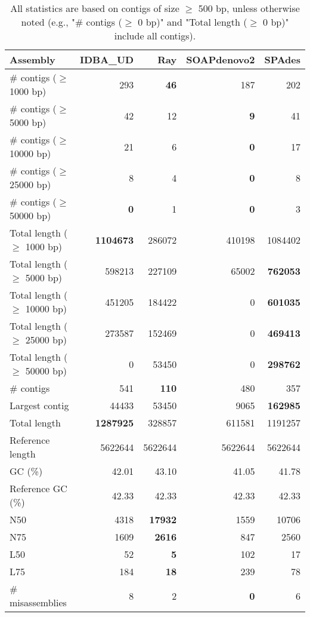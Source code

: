 \documentclass[12pt,a4paper]{article}
\begin{document}
\begin{table}[ht]
\begin{center}
\caption{All statistics are based on contigs of size $\geq$ 500 bp, unless otherwise noted (e.g., "\# contigs ($\geq$ 0 bp)" and "Total length ($\geq$ 0 bp)" include all contigs).}
\begin{tabular}{|l*{4}{|r}|}
\hline
Assembly & IDBA\_UD & Ray & SOAPdenovo2 & SPAdes \\ \hline
\# contigs ($\geq$ 1000 bp) & 293 & {\bf 46} & 187 & 202 \\ \hline
\# contigs ($\geq$ 5000 bp) & 42 & 12 & {\bf 9} & 41 \\ \hline
\# contigs ($\geq$ 10000 bp) & 21 & 6 & {\bf 0} & 17 \\ \hline
\# contigs ($\geq$ 25000 bp) & 8 & 4 & {\bf 0} & 8 \\ \hline
\# contigs ($\geq$ 50000 bp) & {\bf 0} & 1 & {\bf 0} & 3 \\ \hline
Total length ($\geq$ 1000 bp) & {\bf 1104673} & 286072 & 410198 & 1084402 \\ \hline
Total length ($\geq$ 5000 bp) & 598213 & 227109 & 65002 & {\bf 762053} \\ \hline
Total length ($\geq$ 10000 bp) & 451205 & 184422 & 0 & {\bf 601035} \\ \hline
Total length ($\geq$ 25000 bp) & 273587 & 152469 & 0 & {\bf 469413} \\ \hline
Total length ($\geq$ 50000 bp) & 0 & 53450 & 0 & {\bf 298762} \\ \hline
\# contigs & 541 & {\bf 110} & 480 & 357 \\ \hline
Largest contig & 44433 & 53450 & 9065 & {\bf 162985} \\ \hline
Total length & {\bf 1287925} & 328857 & 611581 & 1191257 \\ \hline
Reference length & 5622644 & 5622644 & 5622644 & 5622644 \\ \hline
GC (\%) & 42.01 & 43.10 & 41.05 & 41.78 \\ \hline
Reference GC (\%) & 42.33 & 42.33 & 42.33 & 42.33 \\ \hline
N50 & 4318 & {\bf 17932} & 1559 & 10706 \\ \hline
N75 & 1609 & {\bf 2616} & 847 & 2560 \\ \hline
L50 & 52 & {\bf 5} & 102 & 17 \\ \hline
L75 & 184 & {\bf 18} & 239 & 78 \\ \hline
\# misassemblies & 8 & 2 & {\bf 0} & 6 \\ \hline

\end{tabular}
\end{center}
\end{table}
\end{document}
